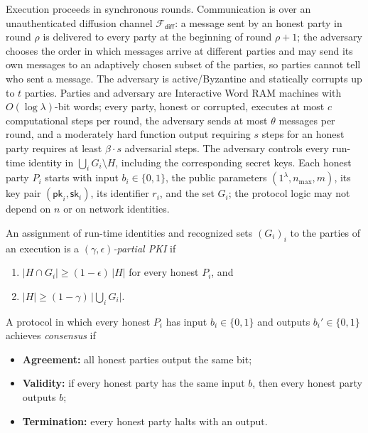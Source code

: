\documentclass{conjura-conjecture}
\newcommand{\pk}{\mathsf{pk}}
\newcommand{\sk}{\mathsf{sk}}
\newcommand{\Fdiff}{\mathcal{F}_{\mathsf{diff}}}
\begin{document}
\begin{definition}\label{def:exec}
Execution proceeds in synchronous rounds. Communication is over an
unauthenticated diffusion channel $\Fdiff$: a message sent by an honest
party in round $\rho$ is delivered to every party at the beginning of
round $\rho+1$; the adversary chooses the order in which messages arrive
at different parties and may send its own messages to an adaptively
chosen subset of the parties, so parties cannot tell who sent a message.
The adversary is active/Byzantine and statically corrupts up to $t$
parties. Parties and adversary are Interactive Word RAM machines with
$O(\log\lambda)$-bit words; every party, honest or corrupted, executes
at most $c$ computational steps per round, the adversary sends at most
$\theta$ messages per round, and a moderately hard function output
requiring $s$ steps for an honest party requires at least
$\beta \cdot s$ adversarial steps. The adversary controls every
run-time identity in
$\bigcup_i G_i \setminus H$, including the corresponding secret keys.
Each honest party $P_i$ starts with input $b_i \in \{0,1\}$, the public
parameters $(1^{\lambda}, n_{\max}, m)$, its key pair $(\pk_i, \sk_i)$,
its identifier $r_i$, and the set $G_i$; the protocol logic may not
depend on $n$ or on network identities.
\end{definition}

\begin{definition}\label{def:ppki}
An assignment of run-time identities and recognized sets $(G_i)_i$ to
the parties of an execution is a \emph{$(\gamma,\epsilon)$-partial PKI}
if
\begin{enumerate}
\item $|H \cap G_i| \ge (1-\epsilon)\,|H|$ for every honest $P_i$, and
\item $|H| \ge (1-\gamma)\,\big|\bigcup_i G_i\big|$.
\end{enumerate}
\end{definition}

\begin{definition}[Consensus]\label{def:consensus}
A protocol in which every honest $P_i$ has input $b_i \in \{0,1\}$ and
outputs $b_i' \in \{0,1\}$ achieves \emph{consensus} if
\begin{itemize}
\item \textbf{Agreement:} all honest parties output the same bit;
\item \textbf{Validity:} if every honest party has the same input $b$,
  then every honest party outputs $b$;
\item \textbf{Termination:} every honest party halts with an output.
\end{itemize}
\end{definition}
\end{document}
